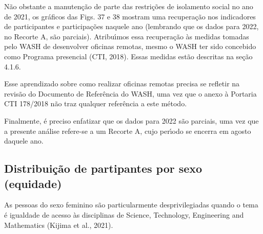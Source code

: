 \documentclass[
12pt,		%
openright,	%
twoside,  %
a4paper,			%
chapter=TITLE,		%
english,			%
french,				%
spanish,			%
brazil				%
]{USPSC-classe/USPSC}
\begin{document}
N\~ao obstante a manuten\c{c}\~ao de parte das restri\c{c}\~oes de isolamento social no ano de 2021, os gr\'aficos das Figs. 37 e 38 mostram uma recupera\c{c}\~ao nos indicadores de participantes e participa\c{c}\~oes naquele ano (lembrando que os dados para 2022, no Recorte A, s\~ao parciais). Atribu\'{\i}mos essa recupera\c{c}\~ao \`as medidas tomadas pelo WASH de desenvolver oficinas remotas, mesmo o WASH ter sido concebido como Programa presencial  (CTI, 2018). Essas medidas est\~ao descritas na se\c{c}\~ao 4.1.6.

















Esse aprendizado sobre como realizar oficinas remotas precisa se refletir na revis\~ao do Documento de Refer\^encia do WASH, uma vez que o anexo \`a Portaria CTI 178/2018 n\~ao traz qualquer refer\^encia a este m\'etodo.

















Finalmente, \'e preciso enfatizar que os dados para 2022 s\~ao parciais, uma vez que a presente an\'alise refere-se a um Recorte A, cujo per\'{\i}odo se encerra em agosto daquele ano.

















\subsection[Distribui\c{c}\~ao de partipantes por sexo (equidade)]{Distribui\c{c}\~ao de partipantes por sexo (equidade)}\label{Distribui\c{c}\~ao de partipantes por sexo (equidade)}
As pessoas do sexo feminino s\~ao particularmente desprivilegiadas quando o tema \'e igualdade de acesso \`as disciplinas de Science, Technology, Engineering and Mathematics (Kijima et al., 2021).
\end{document}
